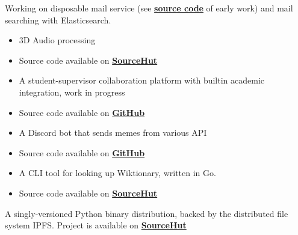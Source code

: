 
Working on disposable mail service (see \textbf{\href{https://github.com/Huy-Ngo/temp-mail} {source code}} of early work) and mail searching with Elasticsearch.


\begin{itemize}
\item 3D Audio processing
\item Source code available on \textbf{\href{https://sr.ht/~cnx/palace}{SourceHut}}
\end{itemize}

\divider

\begin{itemize}
\item A student-supervisor collaboration platform with builtin academic integration, work in progress
\item Source code available on \textbf{\href{https://github.com/Huy-Ngo/acanban}{GitHub}}
\end{itemize}

\divider

\begin{itemize}
\item A Discord bot that sends memes from various API
\item Source code available on \textbf{\href{https://github.com/Huy-Ngo/discord-meme-bot}{GitHub}}
\end{itemize}

\divider

\begin{itemize}
\item A CLI tool for looking up Wiktionary, written in Go.
\item Source code available on \textbf{\href{https://sr.ht/~huyngo/wikt-cli}{SourceHut}}
\end{itemize}

\divider

A singly-versioned Python binary distribution, backed by the distributed file system IPFS. Project is available on \textbf{\href{https://sr.ht/~cnx/ipwhl}{SourceHut}}

